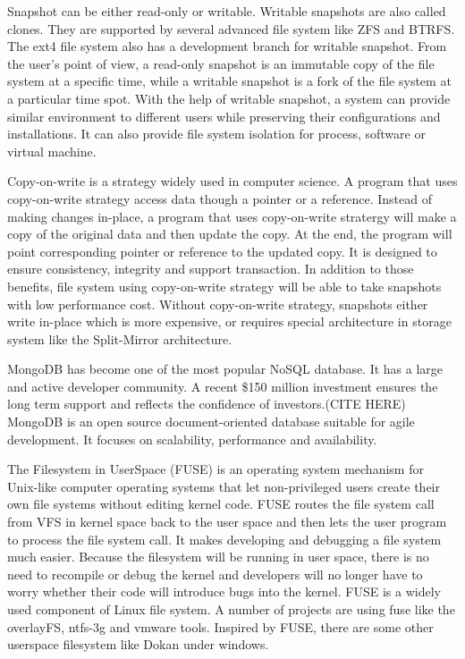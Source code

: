     Snapshot can be either read-only or writable. Writable snapshots are also called clones. They are supported by several advanced file system like ZFS and BTRFS. The ext4 file system also has a development branch for writable snapshot. From the user’s point of view, a read-only snapshot is an immutable copy of the file system at a specific time, while a writable snapshot is a fork of the file system at a particular time spot. With the help of writable snapshot, a system can provide similar environment to different users while preserving their configurations and installations. It can also provide file system isolation for process, software or virtual machine.

    Copy-on-write is a strategy widely used in computer science. A program that uses copy-on-write strategy access data though a pointer or a reference. Instead of making changes in-place, a program that uses copy-on-write stratergy will make a copy of the original data and then update the copy. At the end, the program will point corresponding pointer or reference to the updated copy. It is designed to ensure consistency, integrity and support transaction. In addition to those benefits, file system using copy-on-write strategy will be able to take snapshots with low performance cost. Without copy-on-write strategy, snapshots either write in-place which is more expensive, or requires special architecture in storage system like the Split-Mirror architecture.

    MongoDB has become one of the most popular NoSQL database. It has a large and active developer community. A recent \$150 million investment ensures the long term support and reflects the confidence of investors.(CITE HERE)\cite{rsync_alg}  MongoDB is an open source document-oriented database suitable for agile development. It focuses on scalability, performance and availability.

    The Filesystem in UserSpace (FUSE) is an operating system mechanism for Unix-like computer operating systems that let non-privileged users create their own file systems without editing kernel code. FUSE routes the file system call from VFS in kernel space back to the user space and then lets the user program to process the file system call. It makes developing and debugging a file system much easier. Because the filesystem will be running in user space, there is no need to recompile or debug the kernel and developers will no longer have to worry whether their code will introduce bugs into the kernel. FUSE is a widely used component of Linux file system. A number of projects are using fuse like the overlayFS, ntfs-3g and vmware tools. Inspired by FUSE, there are some other userspace filesystem like Dokan under windows.

